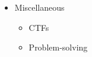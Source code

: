 \documentclass{article}
\begin{document}
\begin{minipage}{\textwidth}
\begin{minipage}[t]{0.5\textwidth}
\begin{itemize}
\begin{itemize}
\begin{itemize}
                            \item Ubuntu
                        \end{itemize}
                    \item Windows
                        \begin{itemize}
                            \item Active Directory
                        \end{itemize}
                \end{itemize}
            \item Miscellaneous
                \begin{itemize}
                    \item CTFs
                    \item Problem-solving
                \end{itemize}
        \end{itemize}
    \end{minipage}
\end{minipage}
       
\vfill
\end{document}
